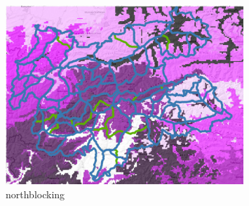 \begin{figure}[ht]
    \centering
    \includegraphics[width=0.8\textwidth]{Figures/figures_snowgrid/south-blocking_15cluster.png}
    \caption{northblocking}
\end{figure}

